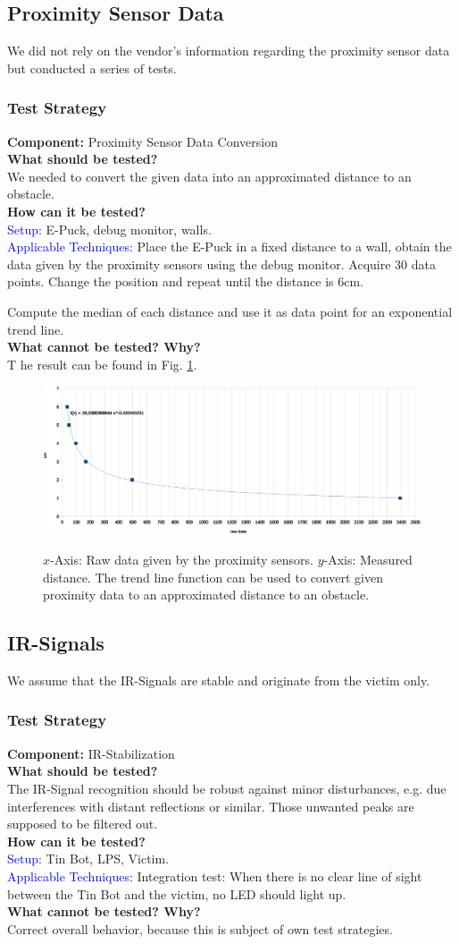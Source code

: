 \documentclass[a4paper,parskip,headheight=38pt]{scrartcl} %
\newcommand{\teststrat}[5]{
    \subsubsection{Test Strategy}
	\textbf{Component:} #1 \\
	\noindent\textbf{What should be tested?} \\
    \noindent #2 \\
	\noindent\textbf{How can it be tested?} \\
    \noindent\textcolor{blue}{Setup:} #3 \\
    \noindent\textcolor{blue}{Applicable Techniques:} #4 \\
	\noindent\textbf{What cannot be tested? Why?} \\
    \noindent #5
}
\begin{document}
\subsection{Proximity Sensor Data}

We did not rely on the vendor's information regarding the proximity sensor data
but conducted a series of tests. 

\teststrat{Proximity Sensor Data Conversion}{
    We needed to convert the given data into an approximated distance to an
    obstacle. 
}{
    E-Puck, debug monitor, walls.
}{
    Place the E-Puck in a fixed distance to a wall, obtain the data given by
    the proximity sensors using the debug monitor. Acquire 30 data points.
    Change the position and repeat until the distance is 6cm.

    Compute the median of each distance and use it as data point for an
    exponential trend line.
}

The result can be found in Fig. \ref{fig:proxdata}.
\begin{figure}[t]
\noindent\includegraphics[width=\textwidth]{Proximitygraph.eps}
\label{fig:proxdata}
\caption{$x$-Axis: Raw data given by the proximity sensors. $y$-Axis: Measured
distance. The trend line function can be used to convert given proximity data
to an approximated distance to an obstacle.}
\end{figure}

\subsection{IR-Signals}
We assume that the IR-Signals are stable and originate from the victim only.

\teststrat{IR-Stabilization}{
    The IR-Signal recognition should be robust against minor disturbances, e.g.
    due interferences with distant reflections or similar.
    Those unwanted peaks are supposed to be filtered out.
}{
    Tin Bot, LPS, Victim.
}{
    Integration test: When there is no clear line of sight between the Tin Bot
    and the victim, no LED should light up.
}{
    Correct overall behavior, because this is subject of own test strategies.
}
\end{document}
